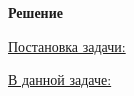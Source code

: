 \documentclass[a4paper,12pt]{report}
\begin{document}
\begin{center}
\Large
{\bf Решение }
\end{center}

\underline{Постановка задачи:}
\begin{equation}
\end{equation}

\underline{В данной задаче:}
\begin{equation}
\begin{aligned}
\end{aligned}
\end{equation}
\end{document}
